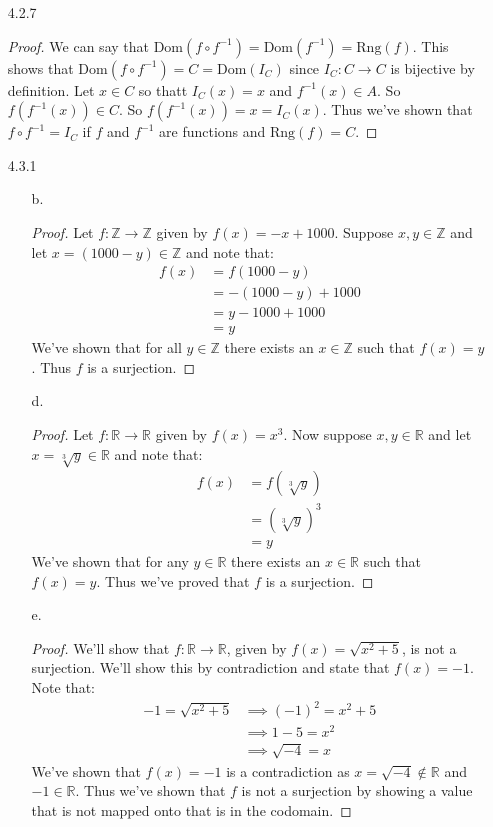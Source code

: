 \documentclass[11pt]{amsart}
\theoremstyle{definition}
\begin{document}
\begin{itemize}
\item[4.2.7] \begin{proof}
		We can say that $\text{Dom}(f\circ f^{-1})=\text{Dom}(f^{-1})=\text{Rng}(f)$. This shows that $\text{Dom}(f\circ f^{-1})=C=\text{Dom}(I_C)$ since $I_C:C\to C$ is bijective by definition. Let $x\in C$ so thatt $I_C(x)=x$ and $f^{-1}(x)\in A$. So $f(f^{-1}(x))\in C$. So $f(f^{-1}(x))=x=I_C(x)$. Thus we've shown that $f\circ f^{-1}=I_C$ if $f$ and $f^{-1}$ are functions and $\text{Rng}(f)=C$.
\end{proof}

\item[4.3.1]
\begin{itemize}
	\item[b.] \begin{proof}
		Let $f:\mathbb{Z}\to\mathbb{Z}$ given by $f(x)=-x+1000$. Suppose $x,y\in\mathbb{Z}$ and let $x=(1000-y)\in\mathbb{Z}$ and note that:
		\begin{align*}
			f(x)
			&=f(1000-y)\\
			&=-(1000-y)+1000\\
			&=y-1000+1000\\
			&=y
		\end{align*}
		We've shown that for all $y\in\mathbb{Z}$ there exists an $x\in\mathbb{Z}$ such that $f(x)=y$. Thus $f$ is a surjection.
	\end{proof}

\item[d.] \begin{proof}
		Let $f:\mathbb{R}\to\mathbb{R}$ given by $f(x)=x^3$. Now suppose $x,y\in\mathbb{R}$ and let $x=\sqrt[3]{y}\in\mathbb{R}$ and note that:
		\begin{align*}
			f(x)
			&=f(\sqrt[3]{y})\\
			&=(\sqrt[3]{y})^3\\
			&=y
		\end{align*}
		We've shown that for any $y\in\mathbb{R}$ there exists an $x\in\mathbb{R}$ such that $f(x)=y$. Thus we've proved that $f$ is a surjection.
	\end{proof}

\item[e.] \begin{proof}
		We'll show that $f:\mathbb{R}\to\mathbb{R}$, given by $f(x)=\sqrt{x^2+5}$, is not a surjection. We'll show this by contradiction and state that $f(x)=-1$. Note that:
		\begin{align*}
			-1=\sqrt{x^2+5}
			&\implies (-1)^2=x^2+5 \\
			&\implies 1-5=x^2 \\
			&\implies \sqrt{-4}=x
		\end{align*}
		We've shown that $f(x)=-1$ is a contradiction as $x=\sqrt{-4}\notin\mathbb{R}$ and $-1\in\mathbb{R}$. Thus we've shown that $f$ is not a surjection by showing a value that is not mapped onto that is in the codomain.
	\end{proof}


\end{itemize}
\end{itemize}
\end{document}
